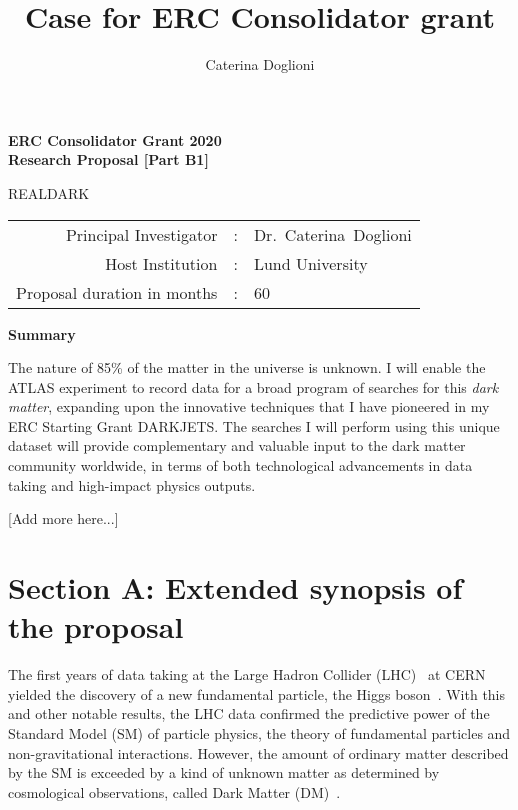 \documentclass[11pt,a4paper]{article}
\title{{\Large Case for ERC Consolidator grant}}
\author{{\normalsize Caterina Doglioni}}
\date{}                                           %
\begin{document}
\begin{center} 

{\Large\bf ERC Consolidator Grant 2020} \\
	{\Large\bf Research Proposal [Part B1]}  \\
 
\vspace{2cm} 
{\huge {\bf }}   \smallskip  

\vspace{2cm} 
{\Huge{REALDARK}} \\ 
\vspace{1cm} 
\vspace{1cm}
\end{center} 
\begin{tabular}{rcl}
Principal Investigator & : & Dr.~Caterina~Doglioni \\
Host Institution & : & Lund University \\ 
Proposal duration in months & : & 60 \\
\end{tabular}  
\vspace{2cm}


\begin{center} {\bf Summary}  \end{center}

The nature of 85\% of the matter in the universe is unknown. I will enable the ATLAS experiment to record data for a broad program of searches for this \textit{dark matter}, expanding upon the innovative techniques that I have pioneered in my ERC Starting Grant DARKJETS. 
The searches I will perform using this unique dataset will provide complementary and valuable input to the dark matter community worldwide, in terms of both technological advancements in data taking and high-impact physics outputs. 

[Add more here...]

\clearpage

\section*{Section A: Extended synopsis of the proposal} 

\medskip

The first years of data taking at the Large Hadron Collider (LHC)~\cite{LHC2008} at CERN yielded the discovery of a new fundamental particle, the Higgs boson~\cite{Khachatryan:2016vau}. With this and other notable results, the LHC data confirmed the predictive power of the Standard Model (SM) of particle physics, the theory of fundamental particles and non-gravitational interactions. However, the amount of ordinary matter described by the SM is exceeded by a kind of unknown matter as determined by cosmological observations, called Dark Matter (DM)~\cite{Bertone:2016nfn}. 
\end{document}
